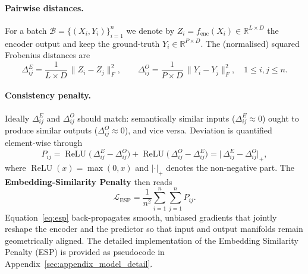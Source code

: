 \documentclass{article}
\begin{document}
\paragraph{Pairwise distances.}
For a batch $\mathcal{B}=\{(X_i,Y_i)\}_{i=1}^{n}$ we denote by
$Z_i\!=f_{\mathrm{enc}}(X_i)\!\in\!\mathbb{R}^{L\times D}$ the encoder output and keep the ground-truth
$Y_i\!\in\!\mathbb{R}^{P\times D}$.
The (normalised) squared Frobenius distances are
\begin{equation}
\Delta^{E}_{ij}=\frac{1}{L \times D}\,\lVert Z_i-Z_j\rVert^2_{F},
\qquad
\Delta^{O}_{ij}=\frac{1}{P \times D}\,\lVert Y_i-Y_j\rVert^2_{F},
\quad 1\!\le i,j\!\le n.
\end{equation}

\paragraph{Consistency penalty.}
Ideally $\Delta^{E}_{ij}$ and $\Delta^{O}_{ij}$ should match:  
semantically similar inputs ($\Delta^{E}_{ij}\!\approx\!0$) ought to produce similar outputs
($\Delta^{O}_{ij}\!\approx\!0$), and vice versa.
Deviation is quantified element-wise through
\begin{equation}
P_{ij}= \operatorname{ReLU}\!\bigl(\,\Delta^{E}_{ij}-\Delta^{O}_{ij}\bigr)
      +\operatorname{ReLU}\!\bigl(\,\Delta^{O}_{ij}-\Delta^{E}_{ij}\bigr)
      =\lvert \,\Delta^{E}_{ij}-\Delta^{O}_{ij}\rvert_{+},
\end{equation}
where $\operatorname{ReLU}(x)=\max(0,x)$ and $|\cdot|_{+}$ denotes the
non-negative part.
The \textbf{Embedding-Similarity Penalty} then reads
\begin{equation}
\mathcal{L}_{\mathrm{ESP}}
      =\frac{1}{n^{2}}\sum_{i=1}^{n}\sum_{j=1}^{n} P_{ij}.
\label{eq:esp}
\end{equation}
Equation~\eqref{eq:esp} back-propagates smooth, unbiased gradients that
jointly reshape the encoder and the predictor so that input and output
manifolds remain geometrically aligned. 
The detailed implementation of the Embedding Similarity Penalty (ESP) is provided as pseudocode in Appendix~\ref{sec:appendix_model_detail}.



\end{document}
